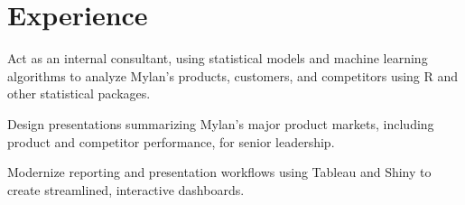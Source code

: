 \documentclass[letterpaper]{deedy-resume} %
\begin{document}
\hfill
%
%
\begin{minipage}[t]{0.63\textwidth} %


\section{Experience}
\vspace{\topsep} %
\begin{tightitemize}
\item Act as an internal consultant, using statistical models and machine learning algorithms to
  analyze Mylan's products, customers, and competitors using R and
  other statistical packages.
\item Design presentations summarizing Mylan's major product markets,
  including product and competitor performance, for senior leadership.
\item Modernize reporting and presentation workflows using Tableau and
  Shiny to create streamlined, interactive dashboards.
\end{tightitemize}
\sectionspace %



\end{minipage}
\end{document}
